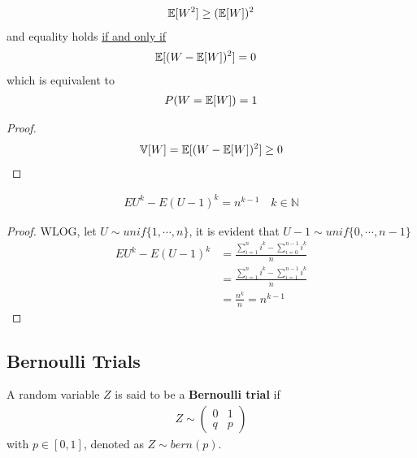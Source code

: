 \documentclass{article}
\begin{document}
   	\begin{corollary}
   		\begin{align}
   			\mathbb{E}[{W^2}] \geq (\mathbb{E}[{W}])^2
   		\end{align}
   		and equality holds \ul{if and only if}
   		\begin{align}
   			\mathbb{E}[{(W - \mathbb{E}[{W}])^2}] &= 0
   		\end{align}
   		which is equivalent to
   		\begin{align}
   			P(W = \mathbb{E}[{W}]) = 1
   		\end{align}
   	\end{corollary}
   	\begin{proof}
   		\begin{align}
	   		\mathbb{V}[{W}] = \mathbb{E}[{(W - \mathbb{E}[{W}])^2}] \geq 0
   		\end{align}
   	\end{proof}
   	
   	\begin{theorem}
   		\begin{align}
   			E U^{k}-E(U-1)^{k}=n^{k-1} \quad k \in \mathbb{N}
   		\end{align}
   	\end{theorem}
   	
   	\begin{proof}
   	WLOG, let $U \sim unif\{1, \cdots, n\}$, it is evident that $U - 1 \sim unif\{0, \cdots, n-1\}$
   		\begin{align}
   			EU^k - E(U-1)^k &= \frac{\sum_{i=1}^n i^k - \sum_{i=0}^{n-1} i^k}{n} \\
   			&= \frac{\sum_{i=1}^n i^k - \sum_{i=1}^{n-1} i^k}{n} \\
   			&= \frac{n^k}{n} = n^{k-1}
   		\end{align}
   	\end{proof}
   	
   	
   	\subsection{Bernoulli Trials}
   	\begin{definition}
   		A random variable $Z$ is said to be a \textbf{Bernoulli trial} if 
   		\begin{align}
   			Z \sim\left(\begin{array}{ll}{0} & {1} \\ {q} & {p}\end{array}\right)
   		\end{align}
   		with $p \in [0, 1]$, denoted as $Z \sim bern(p)$.
   	\end{definition}
   	
\end{document}
